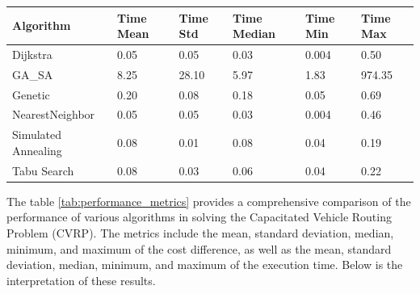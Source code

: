 \documentclass[
]{article}
\begin{document}
\begin{table}[h!]
        \begin{tabularx}{\textwidth}{|l|X|X|X|X|X|}
            \hline
            \textbf{Algorithm}  & \textbf{Time Mean} & \textbf{Time Std} & \textbf{Time Median} & \textbf{Time Min} & \textbf{Time Max} \\
            \hline
            Dijkstra            & 0.05               & 0.05              & 0.03                 & 0.004             & 0.50              \\
            GA\_SA              & 8.25               & 28.10             & 5.97                 & 1.83              & 974.35            \\
            Genetic             & 0.20               & 0.08              & 0.18                 & 0.05              & 0.69              \\
            NearestNeighbor     & 0.05               & 0.05              & 0.03                 & 0.004             & 0.46              \\
            Simulated Annealing & 0.08               & 0.01              & 0.08                 & 0.04              & 0.19              \\
            Tabu Search         & 0.08               & 0.03              & 0.06                 & 0.04              & 0.22              \\
            \hline
        \end{tabularx}
    \end{table}


    The table \ref{tab:performance_metrics} provides a comprehensive comparison of the performance of various algorithms in solving the Capacitated Vehicle Routing Problem (CVRP). The metrics include the mean, standard deviation, median, minimum, and maximum of the cost difference, as well as the mean, standard deviation, median, minimum, and maximum of the execution time. Below is the interpretation of these results.
\end{document}
